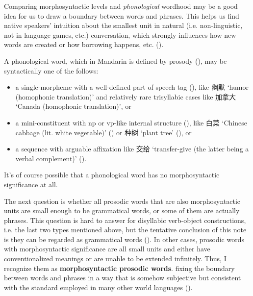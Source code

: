 \documentclass[UTF8, a4paper, oneside, scheme=plain, 12pt]{ctexrep}
\newcommand*{\concept}[1]{\textbf{#1}}
\newcommand{\translate}[1]{`#1'}
\begin{document}
Comparing morphosyntactic levels 
and \emph{phonological} wordhood 
may be a good idea for us to draw a boundary 
between words and phrases.
This helps us find native speakers' intuition 
about the smallest unit in natural (i.e. non-linguistic, not in language games, etc.) conversation,
which strongly influences how new words are created 
or how borrowing happens, etc. ().

A phonological word,
which in Mandarin is defined by prosody (),
may be syntactically one of the follows: 
\begin{itemize}
    \item a single-morpheme with a well-defined part of speech tag (),
    like 幽默 \translate{humor (homophonic translation)} 
    and relatively rare trisyllabic cases 
    like 加拿大 \translate{Canada (homophonic translation)}, or 
    \item a mini-constituent with \acs{np} or \acs{vp}-like internal structure
    (), 
    like 白菜 \translate{Chinese cabbage (lit. white vegetable)} 
    ()
    or 种树 \translate{plant tree} (), or 
    \item a sequence with arguable affixation 
    like 交给 \translate{transfer-give (the latter being a verbal complement)} 
    ().
\end{itemize}
It's of course possible that a phonological word 
has no morphosyntactic significance at all.

The next question is 
whether all prosodic words that are also morphosyntactic units 
are small enough to be grammatical words, 
or some of them are actually phrases.
This question is hard to answer for 
disyllabic verb-object constructions,
i.e. the last two types mentioned above,
but the tentative conclusion of this note 
is they can be regarded as grammatical words
().
In other cases, prosodic words with morphosyntactic significance
are all small units and either have conventionalized meanings 
or are unable to be extended infinitely.
Thus, I recognize them as \concept{morphosyntactic prosodic words}.
fixing the boundary between words and phrases in a way 
that is somehow subjective but consistent with 
the standard employed in many other world languages
().
\end{document}
